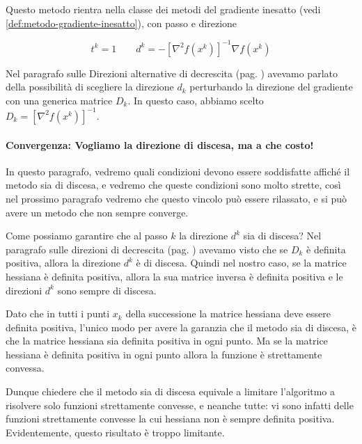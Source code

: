 Questo metodo rientra nella classe dei metodi del gradiente inesatto
(vedi \ref{def:metodo-gradiente-inesatto}), con passo e direzione

\begin{equation}
\label{newtongradesatto}
 t^k = 1 \qquad d^{k} = -[\nabla^{2} f (x^{k})]^{-1} \nabla f(x^{k})
\end{equation}
\begin{notes} Nel paragrafo sulle Direzioni alternative di decrescita
(pag. \pageref{par:direzioni-alternative-decrescita}) avevamo parlato
della possibilit\`a di scegliere la direzione $d_k$ perturbando la
direzione del gradiente con una generica matrice $D_k$. In questo
caso, abbiamo scelto $D_k=[ \nabla^{2}f(x^{k})]^{-1}$.
\end{notes}

\paragraph{Convergenza: Vogliamo la direzione di discesa, ma a che
costo!}  In questo paragrafo, vedremo quali condizioni devono essere
soddisfatte affich\'e il metodo sia di discesa, e vedremo che queste
condizioni sono molto strette, così nel prossimo paragrafo vedremo che
questo vincolo può essere rilassato, e si può avere un metodo che non
sempre converge.

Come possiamo garantire che al passo $k$ la direzione $d^k$ sia di
discesa? Nel paragrafo sulle direzioni di decrescita
(pag. \pageref{par:direzioni-alternative-decrescita}) avevamo visto
che se $D_k$ \`e definita positiva, allora la direzione $d^k$ \`e di
discesa. Quindi nel nostro caso, se la matrice hessiana \`e definita
positiva, allora la sua matrice inversa \`e definita positiva e le
direzioni $d^k$ sono sempre di discesa.

Dato che in tutti i punti $x_k$ della successione la matrice hessiana
deve essere definita positiva, l'unico modo per avere la garanzia che
il metodo sia di discesa, \`e che la matrice hessiana sia definita
positiva in ogni punto. Ma se la matrice hessiana \`e definita positiva
in ogni punto allora la funzione \`e strettamente convessa.

Dunque chiedere che il metodo sia di discesa equivale a limitare
l'algoritmo a risolvere solo funzioni strettamente convesse, e
neanche tutte: vi sono infatti delle funzioni strettamente convesse la
cui hessiana non \`e sempre definita positiva. Evidentemente, questo
risultato \`e troppo limitante.

